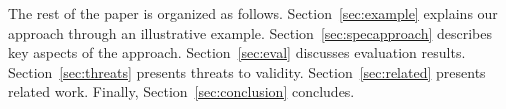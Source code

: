 The rest of the paper is organized as follows. 
Section~\ref{sec:example} explains our approach through an illustrative example.
Section~\ref{sec:specapproach} describes key aspects of the approach.
Section~\ref{sec:eval} discusses evaluation results.
Section~\ref{sec:threats} presents threats to validity.
Section~\ref{sec:related} presents related work.
Finally, Section~\ref{sec:conclusion} concludes.


